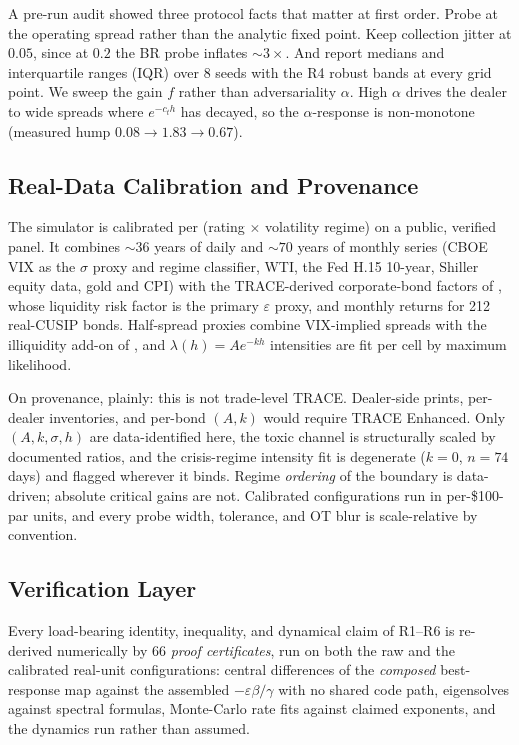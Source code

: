 \documentclass[sigconf,anonymous,review]{acmart}
\newcommand{\eps}{\varepsilon}
\begin{document}
A pre-run audit showed three protocol facts that matter at first order. Probe at the operating spread rather than the
analytic fixed point. Keep collection jitter at $0.05$, since at $0.2$ the BR
probe inflates ${\sim}3\times$. And report medians and interquartile ranges
(IQR) over 8 seeds with the R4 robust bands at every grid point. We sweep the
gain $f$ rather than adversariality $\alpha$. High $\alpha$
drives the dealer to wide spreads where $e^{-c_t h}$ has decayed, so the
$\alpha$-response is non-monotone (measured hump $0.08\to1.83\to0.67$).

\subsection{Real-Data Calibration and Provenance}
\label{sec:data}
The simulator is calibrated per (rating $\times$ volatility regime) on a
public, verified panel. It combines ${\sim}36$ years of daily and ${\sim}70$
years of monthly series (CBOE VIX as the $\sigma$ proxy and regime
classifier, WTI, the Fed H.15 10-year, Shiller equity data, gold and CPI)
with the TRACE-derived corporate-bond factors of \cite{dickerson2023priced},
whose liquidity risk factor is the primary $\eps$ proxy, and monthly returns
for 212 real-CUSIP bonds. Half-spread proxies combine VIX-implied spreads
with the illiquidity
add-on of \cite{friewald2012illiquidity,bao2011illiquidity}, and
$\lambda(h)=Ae^{-kh}$ intensities are fit per cell by maximum likelihood.

On provenance, plainly: this is not trade-level TRACE. Dealer-side prints,
per-dealer inventories, and per-bond $(A,k)$ would require TRACE Enhanced. Only $(A,k,\sigma,h)$ are data-identified here, the
toxic channel is structurally scaled by documented ratios, and the
crisis-regime intensity fit is degenerate ($k=0$, $n=74$ days) and flagged
wherever it binds. Regime \emph{ordering} of the boundary is data-driven;
absolute critical gains are not. Calibrated configurations run in
per-\$100-par units, and every probe width, tolerance, and OT blur is
scale-relative by convention.

\subsection{Verification Layer}
\label{sec:verification}
Every load-bearing identity, inequality, and dynamical claim of R1--R6 is
re-derived numerically by 66 \emph{proof certificates}, run on both the raw
and the calibrated real-unit configurations: central differences of the
\emph{composed} best-response map against the assembled $-\eps\beta/\gamma$
with no shared code path, eigensolves against spectral formulas, Monte-Carlo
rate fits against claimed exponents, and the dynamics run rather than
assumed.
\end{document}
